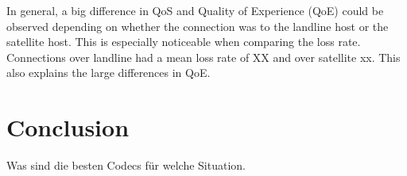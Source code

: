 \documentclass[parskip=full]{scrartcl}
\begin{document}
In general, a big difference in QoS and Quality of Experience (QoE) could be observed depending on whether the connection was to the landline host or the satellite host.
This is especially noticeable when comparing the loss rate.
Connections over landline had a mean loss rate of XX and over satellite xx. 
This also explains the large differences in QoE.
\section{Conclusion}

Was sind die besten Codecs für welche Situation. 

\printbibliography
\end{document}
